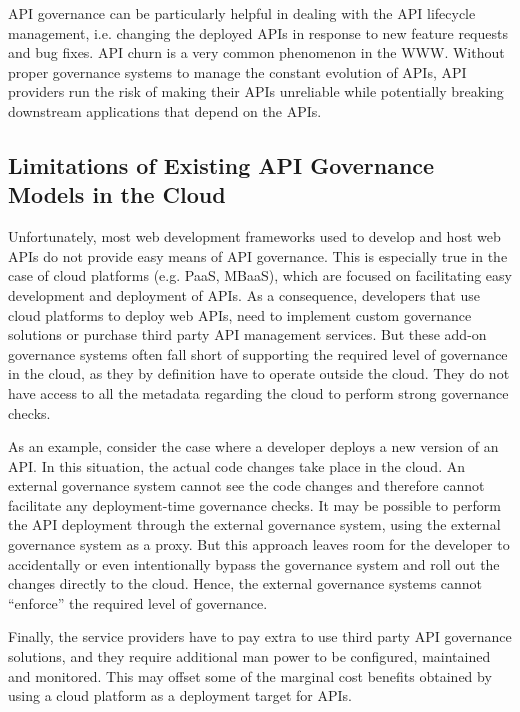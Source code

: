 API governance can be particularly helpful in dealing with the API lifecycle management, i.e. changing the deployed APIs in response to new
feature requests and bug fixes. API churn is a very common phenomenon in the WWW. Without
proper governance systems to manage the constant evolution of APIs, API providers run the risk of making their APIs unreliable
while potentially breaking downstream applications that depend on the APIs.

\subsection{Limitations of Existing API Governance Models in the Cloud}
Unfortunately, most web development frameworks used to develop and host web APIs do not provide easy means of API governance. This is
especially true in the case of cloud platforms (e.g. PaaS, MBaaS), which are focused on facilitating easy development
and deployment of APIs. As a consequence, developers that use cloud platforms to deploy web APIs, 
need to implement custom governance solutions or purchase third party API management services. But 
these add-on governance
systems often fall short of supporting the required level of governance in the cloud, as they by definition have to operate outside the
cloud. They do not have access to all the metadata regarding the cloud to perform strong governance checks. 

As an example, consider the case where a developer deploys a new version of an API. In this
situation, the actual code changes take place in the cloud. An 
external governance system cannot see the code changes and therefore cannot facilitate any deployment-time governance checks.
It may be possible to perform the API deployment through the external governance system, using the external governance system
as a proxy. But this approach leaves room for the developer to accidentally
or even intentionally bypass the governance system and roll out the changes directly to the cloud. Hence, the external governance systems
cannot ``enforce'' the required level of governance.

Finally, the service providers have to pay extra to use third party API governance solutions, and they require
additional man power to be configured, maintained and monitored. This may offset some of the marginal cost benefits obtained
by using a cloud platform as a deployment target for APIs.